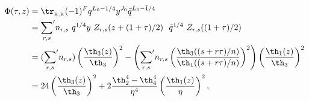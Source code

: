 \begin{equation}
  \begin{split}
    \Phi(\tau,z) &= \tr_{_{\rm R,R}}  (-1)^F q^{L_0-1/4} y^{J_0}
    \bar q^{\bar L_0-\bar 1/4} \\
    &= {\sum_{r,s}}' n_{r,s} ~q^{1/4} y ~Z_{r,s}(z+(1+\tau)/2) ~~\bar
    q^{1/4}  ~\bar Z_{r,s}((1+\tau)/2) \\
    &= ({\sum_{r,s}}' n_{r,s})  \left( {\th_3(z)\over\th_3}
    \right)^2 - \left( {\sum_{r,s}}' n_{r,s} \left( 
   {\th_3((s+r\tau)/n)\over \th_1((s+r\tau)/n)} \right)^2 \right)
     \left( {\th_1(z)\over\th_3} \right)^2\\
     &= 24  \left( {\th_3(z)\over\th_3} \right)^2 
     + 2 {\th_2^4-\th_4^4 \over\eta^4} \left({\th_1(z)\over\eta}\right)^2 ,
  \end{split}
\end{equation}

